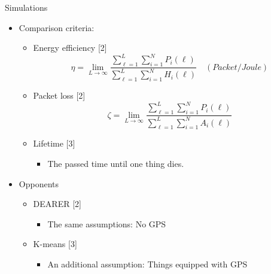 \documentclass{beamer}
\begin{document}
\begin{frame}[t]{Simulations} %
\begin{itemize}
\small
\justifying
\item Comparison criteria:

\begin{itemize}
\item Energy efficiency [2]
\begin{equation}
\eta=\lim_{L\to\infty}\frac{\sum_{\ell=1}^{L}\sum_{i=1}^{N}P_{i}(\ell)}{\sum_{\ell=1}^{L}\sum_{i=1}^{N}H_{i}(\ell)} \quad (Packet/Joule)
\end{equation}
\item Packet loss [2]
\begin{equation}
\zeta=\lim_{L\to\infty}\frac{\sum_{\ell=1}^{L}\sum_{i=1}^{N}P_{i}(\ell)}{\sum_{\ell=1}^{L}\sum_{i=1}^{N}A_{i}(\ell)} 
\end{equation}

\item Lifetime [3]
\begin{itemize}
\item The passed time until one thing dies.
\end{itemize}
\end{itemize}
\item  Opponents
\begin{itemize}
\item DEARER [2]
	\begin{itemize}
	\item The same assumptions: No GPS
	\end{itemize}
\item K-means [3]
	\begin{itemize}
	\item An additional assumption: Things equipped with GPS
	\end{itemize}
\end{itemize}

\end{itemize}
\end{frame}
\end{document}
